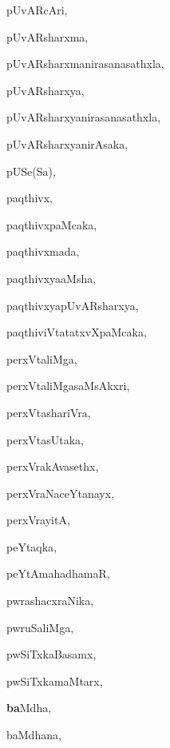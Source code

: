 \begin{multicols}{3}
{\noindent
{pUvARcAri}, \pageref{pUvARcAri}

\noindent
{pUvARsharxma}, \pageref{pUvARsharxma}

\noindent
{pUvARsharxmanirasanasathxla}, \pageref{pUvARsharxmanirasanasathxla}

\noindent
{pUvARsharxya}, \pageref{pUvARsharxya}

\noindent
{pUvARsharxyanirasanasathxla}, \pageref{pUvARsharxyanirasanasathxla}

\noindent
{pUvARsharxyanirAsaka}, \pageref{pUvARsharxyanirAsaka}

\noindent
{pUSe(Sa)}, \pageref{pUSeSa}

\noindent
{paqthivx}, \pageref{paqthivx}

\noindent
{paqthivxpaMcaka}, \pageref{paqthivxpaMcaka}

\noindent
{paqthivxmada}, \pageref{paqthivxmada}

\noindent
{paqthivxyaaMsha}, \pageref{paqthivxyaaMsha}

\noindent
{paqthivxyapUvARsharxya}, \pageref{paqthivxyapUvARsharxya}

\noindent
{paqthiviVtatatxvXpaMcaka}, \pageref{paqthiviVtatatxvXpaMcaka}

\noindent
{perxVtaliMga}, \pageref{perxVtaliMga}

\noindent
{perxVtaliMgasaMsAkxri}, \pageref{perxVtaliMgasaMsAkxri}

\noindent
{perxVtashariVra}, \pageref{perxVtashariVra}

\noindent
{perxVtasUtaka}, \pageref{perxVtasUtaka}

\noindent
{perxVrakAvasethx}, \pageref{perxVrakAvasethx}

\noindent
{perxVraNaceYtanayx}, \pageref{perxVraNaceYtanayx}

\noindent
{perxVrayitA}, \pageref{perxVrayitA}

\noindent
{peYtaqka}, \pageref{peYtaqka}

\noindent
{peYtAmahadhamaR}, \pageref{peYtAmahadhamaR}

\noindent
{pwrashacxraNika}, \pageref{pwrashacxraNika}

\noindent
{pwruSaliMga}, \pageref{pwruSaliMga}

\noindent
{pwSiTxkaBasamx}, \pageref{pwSiTxkaBasamx}

\noindent
{pwSiTxkamaMtarx}, \pageref{pwSiTxkamaMtarx}

\noindent
{{\large\textbf{ba}}Mdha}, \pageref{baMdha}

\noindent
{baMdhana}, \pageref{baMdhana}

}
\end{multicols}

